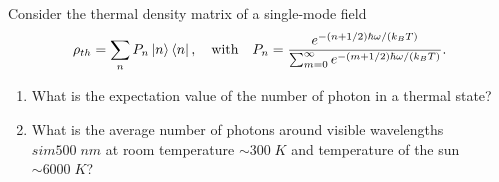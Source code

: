 \begin{example}{}
    Consider the thermal density matrix of a single-mode field 
    \begin{align*}
        \rho_{th}=\sum_nP_n\left|n\right\rangle\left\langle n\right|,\quad\text{with}\quad P_n=\frac{e^{-(n+1/2)\hbar\omega/(k_BT)}}{\sum_{m=0}^\infty e^{-(m+1/2)\hbar\omega/(k_BT)}}.
    \end{align*}
    \begin{enumerate}[itemsep=0pt,topsep=0pt,parsep=0pt,label=\alph*)]
        \item What is the expectation value of the number of photon in a thermal state?
        \item What is the average number of photons around visible wavelengths $sim500\;nm$ at room temperature 
        $\sim300\;K$ and temperature of the sun $\sim6000\;K$?
    \end{enumerate}

\end{example}
